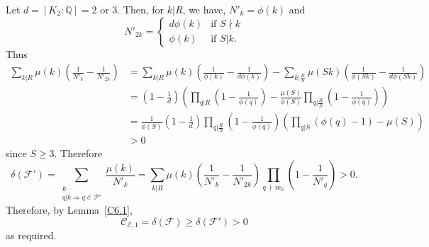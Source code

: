 \documentclass{amsart}
\theoremstyle{plain}
\theoremstyle{remark}
\newcommand{\E}{\mathcal{E}}
\newcommand{\Fc}{\mathcal{F}}
\begin{document}
   Let $d=[K_2:\mathbb{Q}] = 2$ or $3$. Then, for $k|R$, we have, $N'_k=\phi(k)$ and 
   \[N'_{2k}= \begin{cases}d \phi(k) & \text{if $S \nmid k$}\\ \phi(k) &  \text{if $S|k$.}\end{cases}\] Thus
    \begin{align*}
        \sum_{k|R}\mu(k)\left(\frac{1}{N'_k}-\frac{1}{N'_{2k}} \right)&=\sum_{k|R}\mu(k)\left(\frac{1}{\phi(k)}-\frac{1}{d\phi(k)}\right)-\sum_{k|\frac{R}{S}}\mu(Sk)\left(\frac{1}{\phi(Sk)}-\frac{1}{d\phi(Sk)}\right) \\
        &=\left(1-\frac{1}{d}\right)\left(\prod_{q|R }\left(1-\frac{1}{\phi(q)}\right)-\frac{\mu(S)}{\phi(S)}\prod_{q|\frac{R}{S} }\left(1-\frac{1}{\phi(q)}\right)\right) \\
        &= \frac{1}{\phi(S)}\left(1-\frac{1}{d}\right)\prod_{q|\frac{R}{S} }\left(1-\frac{1}{\phi(q)}\right)\left(\prod_{q|S }(\phi(q)-1)-\mu(S)\right) \\
        &>0
    \end{align*}
    since $S \ge 3$. Therefore
    \[\delta(\Fc') = \sum_{\substack{k \\ q|k \Rightarrow q \in \mathcal{P}'}} \frac{\mu(k)}{N'_k}=\sum_{k|R}\mu(k)\left(\frac{1}{N'_k}-\frac{1}{N'_{2k}} \right)\prod_{q \: \nmid \, m_{\E}} \left(1-\frac{1}{N'_q}\right)>0.\]
    Therefore, by Lemma~\ref{C6.1}, 
\[\mathcal{C}_{\E,1}=\delta(\mathcal{F})\ge\delta(\mathcal{F}')> 0\]
as required.

\printbibliography
\end{document}
